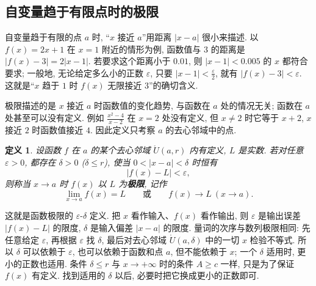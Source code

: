 \documentclass[UTF8,openany]{ctexbook}
\theoremstyle{chinesetextbook}
\newtheorem{definition}{定义}[section]
\begin{document}
\subsection{自变量趋于有限点时的极限}
自变量趋于有限的点 $a$ 时, “$x$ 接近 $a$”用距离 $|x-a|$ 很小来描述. 以 $f(x)=2x+1$ 在 $x=1$ 附近的情形为例, 函数值与 $3$ 的距离是 $|f(x)-3|=2|x-1|$. 若要求这个距离小于 $0.01$, 则 $|x-1|<0.005$ 的 $x$ 都符合要求; 一般地, 无论给定多么小的正数 $\varepsilon$, 只要 $\displaystyle|x-1|<\frac\varepsilon2$, 就有 $|f(x)-3|<\varepsilon$. 这就是“$x$ 趋于 $1$ 时 $f(x)$ 无限接近 $3$”的确切含义.

极限描述的是 $x$ 接近 $a$ 时函数值的变化趋势, 与函数在 $a$ 处的情况无关; 函数在 $a$ 处甚至可以没有定义. 例如 $\displaystyle\frac{x^2-4}{x-2}$ 在 $x=2$ 处没有定义, 但 $x\ne2$ 时它等于 $x+2$, $x$ 接近 $2$ 时函数值接近 $4$. 因此定义只考察 $a$ 的去心邻域中的点.
\begin{definition}
设函数 $f$ 在 $a$ 的某个去心邻域 $\mathring U(a,r)$ 内有定义, $L$ 是实数. 若对任意 $\varepsilon>0$, 都存在 $\delta>0$ ($\delta\le r$), 使当 $0<|x-a|<\delta$ 时恒有
\[
|f(x)-L|<\varepsilon,
\]
则称当 $x\to a$ 时 $f(x)$ 以 $L$ 为\textbf{极限}, 记作
\[
\lim_{x\to a}f(x)=L\qquad\text{或}\qquad f(x)\to L\ (x\to a).
\]
\end{definition}
这就是函数极限的 $\varepsilon$-$\delta$ 定义. 把 $x$ 看作输入、$f(x)$ 看作输出, 则 $\varepsilon$ 是输出误差 $|f(x)-L|$ 的限度, $\delta$ 是输入偏差 $|x-a|$ 的限度. 量词的次序与数列极限相同: 先任意给定 $\varepsilon$, 再根据 $\varepsilon$ 找 $\delta$, 最后对去心邻域 $\mathring U(a,\delta)$ 中的一切 $x$ 检验不等式. 所以 $\delta$ 可以依赖于 $\varepsilon$, 也可以依赖于函数和点 $a$, 但不能依赖于 $x$; 一个 $\delta$ 适用时, 更小的正数也适用. 条件 $\delta\le r$ 与 $x\to+\infty$ 时的条件 $A\ge c$ 一样, 只是为了保证 $f(x)$ 有定义. 找到适用的 $\delta$ 以后, 必要时把它换成更小的正数即可.
\end{document}
